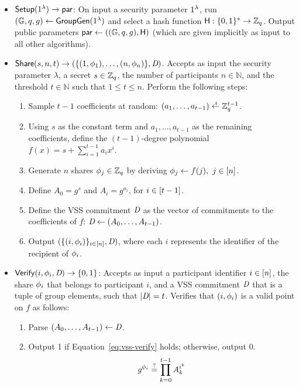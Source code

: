 \begin{itemize}
    \item $\mathsf{Setup}(1^\lambda) \rightarrow \mathsf{par}$:
    On input a security parameter $1^\lambda$,
    run $(\mathbb{G}, q, g) \gets \mathsf{GroupGen}(1^{\lambda})$ and select a hash function $\mathsf{H}: \{0,1\}^* \rightarrow \mathbb{Z}_q$.
    Output public parameters $\mathsf{par} \gets ((\mathbb{G}, q, g), \mathsf{H})$ (which are given implicitly as input to all other algorithms).

    \item $\mathsf{Share}(s, n, t) \rightarrow (\{ (1,\phi_1), \ldots, (n,\phi_n)\}, \textit{D})$.
      Accepts as input the security parameter $\lambda$,
      a secret $s \in \mathbb{Z}_q$,
      the number of participants $n \in \mathbb{N}$,
      and the threshold $t \in \mathbb{N}$ such that $1 \leq t \leq n$.
      Perform the following steps:
    \begin{enumerate}
        \item  Sample $t-1$ coefficients at random: $(a_1, \ldots, a_{t-1}) \rgets \Zq^{t-1}$.
        \item Using $s$ as the constant term and $a_1, \ldots, a_{t-1}$ as the remaining coefficients, define the $(t-1)$-degree polynomial $f(x) = s + \sum_{i=1}^{t-1} a_i x^i$.
        \item Generate $n$ shares $\phi_j \in \mathbb{Z}_q $ by deriving $ \phi_j \gets f(j),\ j \in [n] $.
        \item Define $A_0 = g^s$ and $A_i = g^{a_i}$, for $i \in [t-1]$.
        \item Define the VSS commitment $\textit{D}$ as the vector of commitments to the coefficients of $f$: $\textit{D} \gets ( A_0, \ldots, A_{t-1} )$.
        \item Output $(\{(i, \phi_i) \}_{i \in [n]}, \textit{D})$, where each $i$ represents the identifier of the recipient of $\phi_i$.
    \end{enumerate}

    \item $\mathsf{Verify}(i, \phi_i, \textit{D}) \rightarrow \{ 0, 1\}$:
      Accepts as input a participant identifier $i \in [n]$,
      the share $\phi_i$ that belongs to participant $i$,
      and a VSS commitment $\textit{D}$ that is a tuple of group elements, such that $\lvert \textit{D} \rvert = t$.
      Verifies that $(i,\phi_i)$ is a valid point on $f$ as follows:
    \begin{enumerate}
        \item Parse $(A_0, \ldots, A_{t-1} ) \gets \textit{D}$.
        \item Output 1 if Equation~\ref{eq:vss-verify} holds; otherwise, output $0$.
          \begin{equation} \label{eq:vss-verify}
            g^{\phi_i} \stackrel{?}{=} \prod_{k=0}^{t-1} A_k^{i^k}
          \end{equation}
    \end{enumerate}


\end{itemize}
